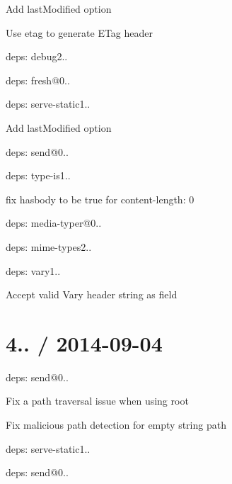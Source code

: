 \begin{DoxyItemize}
\begin{DoxyItemize}
\item Add {\ttfamily last\+Modified} option
\item Use {\ttfamily etag} to generate {\ttfamily E\+Tag} header
\item deps\+: debug2..
\item deps\+: fresh@0..
\end{DoxyItemize}
\item deps\+: serve-\/static1..
\begin{DoxyItemize}
\item Add {\ttfamily last\+Modified} option
\item deps\+: send@0..
\end{DoxyItemize}
\item deps\+: type-\/is1..
\begin{DoxyItemize}
\item fix {\ttfamily hasbody} to be true for {\ttfamily content-\/length\+: 0}
\item deps\+: media-\/typer@0..
\item deps\+: mime-\/types2..
\end{DoxyItemize}
\item deps\+: vary1..
\begin{DoxyItemize}
\item Accept valid {\ttfamily Vary} header string as {\ttfamily field}
\end{DoxyItemize}
\end{DoxyItemize}

\section*{4.. / 2014-\/09-\/04 }


\begin{DoxyItemize}
\item deps\+: send@0..
\begin{DoxyItemize}
\item Fix a path traversal issue when using {\ttfamily root}
\item Fix malicious path detection for empty string path
\end{DoxyItemize}
\item deps\+: serve-\/static1..
\begin{DoxyItemize}
\item deps\+: send@0..
\end{DoxyItemize}
\end{DoxyItemize}

